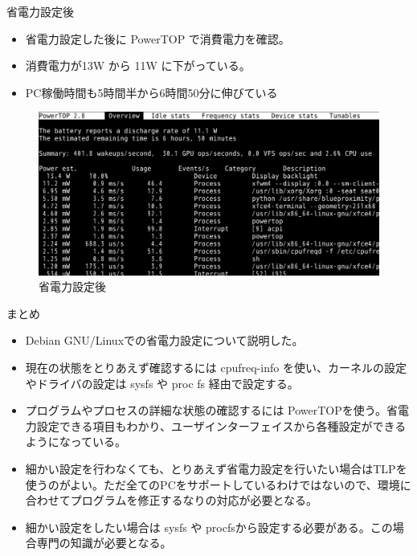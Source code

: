 \begin{frame}{省電力設定後}
\begin{itemize}
\item 省電力設定した後に PowerTOP で消費電力を確認。
\item 消費電力が13W から 11W に下がっている。
\item PC稼働時間も5時間半から6時間50分に伸びている
\end{itemize}

\begin{figure}[H]
\begin{center}
\includegraphics[width=0.8\hsize]{image201602/powertop_02.png}
\end{center}
\label{fig:powertop2}
\caption{省電力設定後} 
\end{figure}

\end{frame}

\begin{frame}{まとめ}

\begin{itemize}

\item Debian GNU/Linuxでの省電力設定について説明した。
\item 現在の状態をとりあえず確認するには cpufreq-info を使い、カーネルの設定やドライバの設定は
sysfs や proc fs 経由で設定する。
\item プログラムやプロセスの詳細な状態の確認するには
PowerTOPを使う。省電力設定できる項目もわかり、ユーザインターフェイスから各種設定ができるようになっている。
\item
細かい設定を行わなくても、とりあえず省電力設定を行いたい場合はTLPを使うのがよい。ただ全てのPCをサポートしているわけではないので、環境に合わせてプログラムを修正するなりの対応が必要となる。
\item 細かい設定をしたい場合は sysfs や procfsから設定する必要がある。この場合専門の知識が必要となる。

\end{itemize}
\end{frame}


